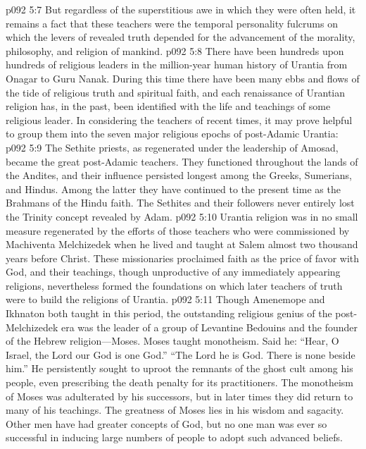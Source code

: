 \vs p092 5:7 But regardless of the superstitious awe in which they were often held, it remains a fact that these teachers were the temporal personality fulcrums on which the levers of revealed truth depended for the advancement of the morality, philosophy, and religion of mankind.
\vs p092 5:8 There have been hundreds upon hundreds of religious leaders in the million\hyp{}year human history of Urantia from Onagar to Guru Nanak. During this time there have been many ebbs and flows of the tide of religious truth and spiritual faith, and each renaissance of Urantian religion has, in the past, been identified with the life and teachings of some religious leader. In considering the teachers of recent times, it may prove helpful to group them into the seven major religious epochs of post\hyp{}Adamic Urantia:
\pc \vs p092 5:9 \bibnobreakspace {} The Sethite priests, as regenerated under the leadership of Amosad, became the great post\hyp{}Adamic teachers. They functioned throughout the lands of the Andites, and their influence persisted longest among the Greeks, Sumerians, and Hindus. Among the latter they have continued to the present time as the Brahmans of the Hindu faith. The Sethites and their followers never entirely lost the Trinity concept revealed by Adam.
\pc \vs p092 5:10 \bibnobreakspace {} Urantia religion was in no small measure regenerated by the efforts of those teachers who were commissioned by Machiventa Melchizedek when he lived and taught at Salem almost two thousand years before Christ. These missionaries proclaimed faith as the price of favor with God, and their teachings, though unproductive of any immediately appearing religions, nevertheless formed the foundations on which later teachers of truth were to build the religions of Urantia.
\pc \vs p092 5:11 \bibnobreakspace {} Though Amenemope and Ikhnaton both taught in this period, the outstanding religious genius of the post\hyp{}Melchizedek era was the leader of a group of Levantine Bedouins and the founder of the Hebrew religion---Moses. Moses taught monotheism. Said he: “Hear, O Israel, the Lord our God is one God.” “The Lord he is God. There is none beside him.” He persistently sought to uproot the remnants of the ghost cult among his people, even prescribing the death penalty for its practitioners. The monotheism of Moses was adulterated by his successors, but in later times they did return to many of his teachings. The greatness of Moses lies in his wisdom and sagacity. Other men have had greater concepts of God, but no one man was ever so successful in inducing large numbers of people to adopt such advanced beliefs.
